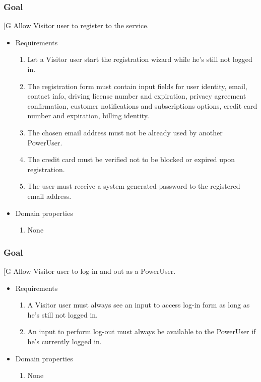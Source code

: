     \subsubsection{Goal }
    {[}G\arabic{goalctr}{]}
    Allow Visitor user to register to the service.
    \begin{itemize}
        \item Requirements
        \begin{enumerate}[REQ]
    		    \item Let a Visitor user start the registration wizard while he's still not logged in.
			    \item The registration form must contain input fields for user identity, email, contact info, driving license number and expiration, privacy agreement confirmation, customer notifications and subscriptions options, credit card number and expiration, billing identity.
			    \item The chosen email address must not be already used by another PowerUser.
			    \item The credit card must be verified not to be blocked or expired upon registration.
			    \item The user must receive a system generated password to the registered email address.
        \end{enumerate}
        \item Domain properties
        \begin{enumerate}[PRO]
    			\item None
        \end{enumerate}
    \end{itemize}

    \subsubsection{Goal }
    {[}G\arabic{goalctr}{]}
    Allow Visitor user to log-in and out as a PowerUser.
    \begin{itemize}
        \item Requirements
        \begin{enumerate}[REQ]
			    \item A Visitor user must always see an input to access log-in form as long as he's still not logged in.
		        \item An input to perform log-out must always be available to the PowerUser if he's currently logged in.
        \end{enumerate}
        \item Domain properties
        \begin{enumerate}[PRO]
    			\item None
        \end{enumerate}
    \end{itemize}

